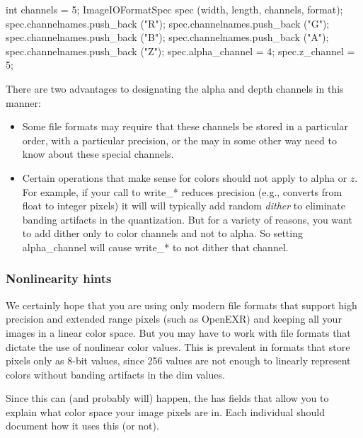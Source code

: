 \begin{code}
        int channels = 5;
        ImageIOFormatSpec spec (width, length, channels, format);
        spec.channelnames.push_back ("R");
        spec.channelnames.push_back ("G");
        spec.channelnames.push_back ("B");
        spec.channelnames.push_back ("A");
        spec.channelnames.push_back ("Z");
        spec.alpha_channel = 4;
        spec.z_channel = 5;
\end{code}

There are two advantages to designating the alpha and depth channels in
this manner:  
\begin{itemize}
\item Some file formats may require that these channels be stored in a
  particular order, with a particular precision, or the \ImageOutput may
  in some other way need to know about these special channels.
\item Certain operations that make sense for colors should not apply to
  alpha or $z$.  For example, if your call to {\cf write_*} reduces
  precision (e.g., converts from {\cf float} to integer pixels) it will
  will typically add random \emph{dither} to eliminate banding artifacts
  in the quantization.  But for a variety of reasons, you want to add
  dither only to color channels and not to alpha.  So setting {\cf
    alpha_channel} will cause {\cf write_*} to not dither that channel.
\end{itemize}

\subsubsection{Nonlinearity hints}

We certainly hope that you are using only modern file formats that
support high precision and extended range pixels (such as OpenEXR) and
keeping all your images in a linear color space.  But you may have to
work with file formats that dictate the use of nonlinear color values.
This is prevalent in formats that store pixels only as 8-bit values,
since 256 values are not enough to linearly represent colors without
banding artifacts in the dim values.

Since this can (and probably will) happen, the \ImageIOFormatSpec has
fields that allow you to explain what color space your image pixels are
in.  Each individual \ImageOutput should document how it uses this (or
not).

